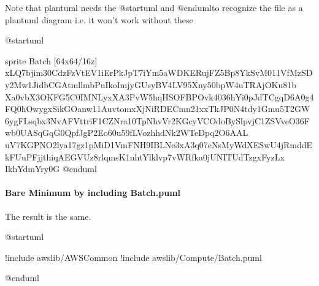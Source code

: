 \documentclass[letterpaper,10pt,english]{sphinxmanual}
\begin{document}
Note that plantuml needs the @startuml and @endumlto recognize the file
as a plantuml diagram i.e. it won’t work without these

\begin{figure}[htbp]
\centering

\end{figure}

%
\begin{sphinxVerbatim}[commandchars=\\\{\},numbers=left,firstnumber=1,stepnumber=1]
@startuml

sprite \PYGZdl{}Batch [64x64/16z] \PYGZob{}
xLQ7bjim30CdzFzVtEV1iErPkJpT7iYm5aWDKERujFZ5Bp8YkSvM011VfMzSDy2Mw1JidbCGAtmllmbPuIkoImjyGUsyBV4LV95\PYGZus{}Xny50bpW4uTRAjOKu81b
Xa0vbX3OKFG5C0IMNLyxXA\PYGZus{}3PvW5hqHSOFBP\PYGZus{}Ovk4036hYi0pJdTCgqD6A0g4FQ0hOwygxSikGOanw11AuvtomxXjNiRDECmn21xxTkJP0N4tdy1Gmu5T2GW
6ygFL\PYGZus{}sqbx3NvA\PYGZus{}FVtt\PYGZus{}ri\PYGZus{}F1CZNra\PYGZhy{}10TpNhvVr2KGcyVCOdoBySlpv\PYGZhy{}jC1ZSVveO36\PYGZus{}Fwb0UASqGqG0QpfJgP2Eo60u59\PYGZhy{}fLVozhhdNk2WTeDpq2O6AAL\PYGZus{}
uV7KGPNO2lya17gz1pMiD1VmFNH9IBLNe3xA3q07eNsMy\PYGZus{}WdXESwU4jRmddEk\PYGZhy{}FUuPFjjthiqAEGVUz8rlqmsK1nhtYlklvp7vWRfka0jUNITUdTzgxFyzLx
\PYGZhy{}Ikh\PYGZus{}YdmYr\PYGZus{}y0G
\PYGZcb{}
@enduml

\end{sphinxVerbatim}
\sphinxresetverbatimhllines


\paragraph{Bare Minimum by including Batch.puml}
\label{\detokenize{StdlibUnderTheHood/StdlibUnderstanding:bare-minimum-by-including-batch-puml}}
The result is the same.

\begin{figure}[htbp]
\centering

\end{figure}

%
\begin{sphinxVerbatim}[commandchars=\\\{\},numbers=left,firstnumber=1,stepnumber=1]
@startuml 

!include \PYGZlt{}awslib/AWSCommon\PYGZgt{}
!include \PYGZlt{}awslib/Compute/Batch.puml\PYGZgt{}

@enduml
\end{sphinxVerbatim}
\sphinxresetverbatimhllines
\end{document}
